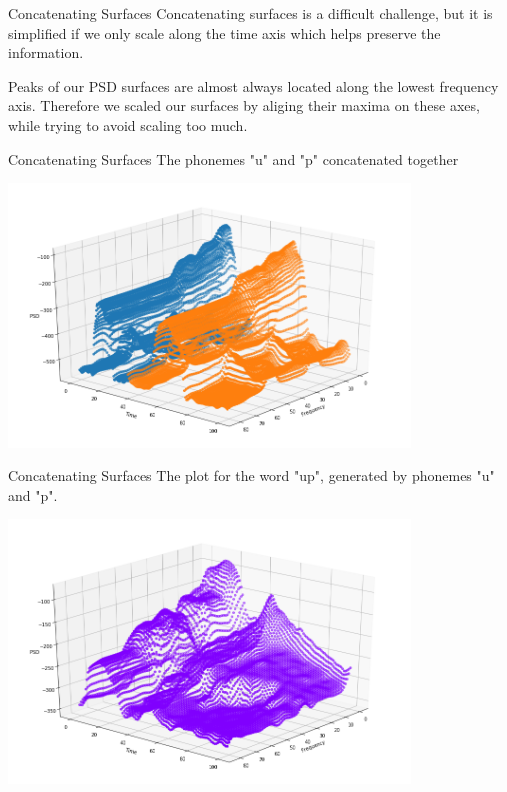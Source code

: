\documentclass[14pt,aspectratio=169, serif, dvipsnames]{beamer}
\begin{document}
\begin{frame}{Concatenating Surfaces}
    Concatenating surfaces is a difficult challenge, but it is simplified if we only scale along the time axis which helps preserve the information.
    \vspace{1cm}
    
    Peaks of our PSD surfaces are almost always located along the lowest frequency axis. Therefore we scaled our surfaces by aliging their maxima on these axes, while trying to avoid scaling too much. 
\end{frame}

\begin{frame}{Concatenating Surfaces}
The phonemes "u" and "p" concatenated together
\begin{center}
    \includegraphics[width = 0.8\textwidth]{pictures/uh_p_plot.png}
\end{center}

\end{frame}

\begin{frame}{Concatenating Surfaces}
    The plot for the word "up", generated by phonemes 
    "u" and "p".
    \begin{center}
        \includegraphics[width = 0.8\textwidth]{pictures/up_plot.png}
    \end{center}
\end{frame}
\end{document}
